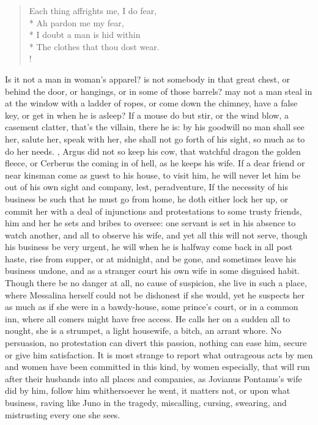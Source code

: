 \translationrule%
\begin{verse}%
Each thing affrights me, I do fear,\\*
Ah pardon me my fear,\\*
I doubt a man is hid within\\*
The clothes that thou dost wear.\\!
\end{verse}%
%
Is it not a man in woman's apparel? is not somebody in that great
chest, or behind the door, or hangings, or in some of those barrels?
may not a man steal in at the window with a ladder of ropes, or come
down the chimney, have a false key, or get in when he is asleep? If a
mouse do but stir, or the wind blow, a casement clatter, that's the
villain, there he is: by his goodwill no man shall see her, salute her,
speak with her, she shall not go forth of his sight, so much as to do
her needs. , \etc{} Argus did not so keep his
cow, that watchful dragon the golden fleece, or Cerberus the coming in
of hell, as he keeps his wife. If a dear friend or near kinsman come as
guest to his house, to visit him, he will never let him be out of his
own sight and company, lest, peradventure, \etc{} If the necessity of his
business be such that he must go from home, he doth either lock her up,
or commit her with a deal of injunctions and protestations to some
trusty friends, him and her he sets and bribes to oversee: one servant
is set in his absence to watch another, and all to observe his wife,
and yet all this will not serve, though his business be very urgent, he
will when he is halfway come back in all post haste, rise from supper,
or at midnight, and be gone, and sometimes leave his business undone,
and as a stranger court his own wife in some disguised habit. Though
there be no danger at all, no cause of suspicion, she live in such a
place, where Messalina herself could not be dishonest if she would, yet
he suspects her as much as if she were in a bawdy-house, some prince's
court, or in a common inn, where all comers might have free access. He
calls her on a sudden all to nought, she is a strumpet, a light
housewife, a bitch, an arrant whore. No persuasion, no protestation can
divert this passion, nothing can ease him, secure or give him
satisfaction. It is most strange to report what outrageous acts by men
and women have been committed in this kind, by women especially, that
will run after their husbands into all places and companies, as
Jovianus Pontanus's wife did by him, follow him whithersoever he went,
it matters not, or upon what business, raving like Juno in the tragedy,
miscalling, cursing, swearing, and mistrusting every one she sees.

